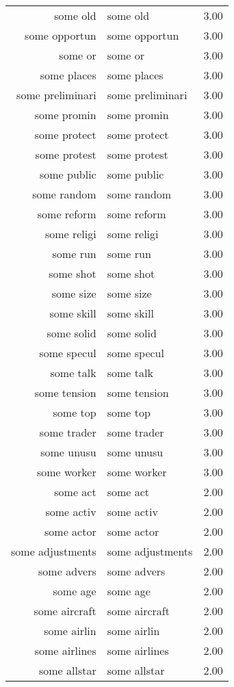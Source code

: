 \begin{table}[ht]
\begin{tabular}{rlr}
  some old & some old & 3.00 \\ 
  some opportun & some opportun & 3.00 \\ 
  some or & some or & 3.00 \\ 
  some places & some places & 3.00 \\ 
  some preliminari & some preliminari & 3.00 \\ 
  some promin & some promin & 3.00 \\ 
  some protect & some protect & 3.00 \\ 
  some protest & some protest & 3.00 \\ 
  some public & some public & 3.00 \\ 
  some random & some random & 3.00 \\ 
  some reform & some reform & 3.00 \\ 
  some religi & some religi & 3.00 \\ 
  some run & some run & 3.00 \\ 
  some shot & some shot & 3.00 \\ 
  some size & some size & 3.00 \\ 
  some skill & some skill & 3.00 \\ 
  some solid & some solid & 3.00 \\ 
  some specul & some specul & 3.00 \\ 
  some talk & some talk & 3.00 \\ 
  some tension & some tension & 3.00 \\ 
  some top & some top & 3.00 \\ 
  some trader & some trader & 3.00 \\ 
  some unusu & some unusu & 3.00 \\ 
  some worker & some worker & 3.00 \\ 
  some act & some act & 2.00 \\ 
  some activ & some activ & 2.00 \\ 
  some actor & some actor & 2.00 \\ 
  some adjustments & some adjustments & 2.00 \\ 
  some advers & some advers & 2.00 \\ 
  some age & some age & 2.00 \\ 
  some aircraft & some aircraft & 2.00 \\ 
  some airlin & some airlin & 2.00 \\ 
  some airlines & some airlines & 2.00 \\ 
  some allstar & some allstar & 2.00 \\ 

\end{tabular}
\end{table}
